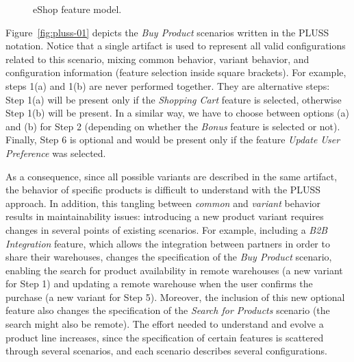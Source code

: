 \documentclass{sig-alternate}
\begin{document}
\begin{figure}[th]
\begin{center}

\caption{eShop feature model.}
\label{fig:eshop-fm}
\end{center}
\end{figure} 





Figure~\ref{fig:pluss-01} depicts the \emph{Buy Product} scenarios written in
the PLUSS notation. Notice that a single artifact is used to represent all valid
configurations related to this scenario, mixing common behavior, variant
behavior, and configuration information (feature selection inside square
brackets). For example, steps 1(a) and 1(b) are never performed together. They
are alternative steps: Step 1(a) will be present only if the \emph{Shopping
Cart} feature is selected, otherwise Step 1(b) will be present. In a similar
way, we have to choose between options (a) and (b) for Step 2 (depending
on whether the \emph{Bonus} feature is selected or not). Finally, Step 6 is
optional and would be present only if the feature \emph{Update User Preference} was selected.

As a consequence, since all possible variants are described in the same
artifact, the behavior of specific products is difficult to understand with the
PLUSS approach. In addition, this tangling between \emph{common} and
\emph{variant} behavior results in maintainability issues: introducing a new product variant
requires changes in several points of existing scenarios. For example, including a
\emph{B2B Integration} feature, which allows the integration between partners in
order to share their warehouses, changes the specification of the \emph{Buy
Product} scenario, enabling the search for product availability in remote
warehouses (a new variant for Step 1) and updating a remote warehouse when the
user confirms the purchase (a new variant for Step 5). Moreover, the inclusion of
this new optional feature also changes the specification of the \emph{Search for
Products} scenario (the search might also be remote). The effort
needed to understand and evolve a product line increases, since the
specification of certain features is scattered through several scenarios,
and each scenario describes several configurations.
\end{document}
